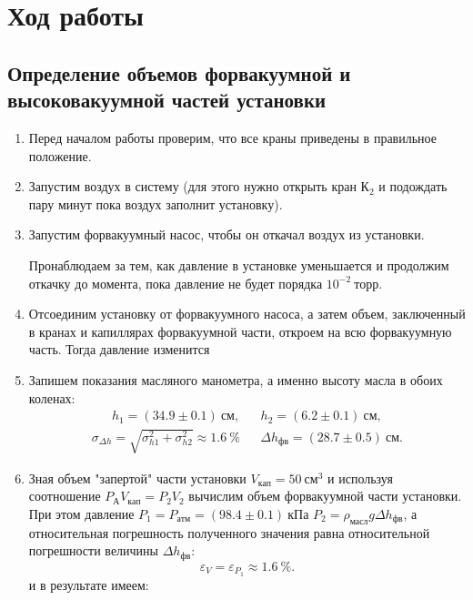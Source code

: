 \documentclass[a4paper,12pt]{article}
\begin{document}
\section{Ход работы}

\subsection{Определение объемов форвакуумной и высоковакуумной частей установки}

\begin{enumerate}

  \item Перед началом работы проверим, что все краны приведены в правильное положение.

  \item Запустим воздух в систему (для этого нужно открыть кран $К_2$  и подождать пару минут пока воздух заполнит установку).

  \item Запустим форвакуумный насос, чтобы он откачал воздух из установки.

        Пронаблюдаем за тем, как давление в установке уменьшается и продолжим откачку до момента, пока давление не будет порядка $ 10^{-2}~торр$.

  \item Отсоединим установку от форвакуумного насоса, а затем объем, заключенный в кранах и капиллярах форвакуумной части, откроем на всю форвакуумную часть. Тогда давление изменится

  \item Запишем показания масляного манометра, а именно высоту масла в обоих коленах:
        \begin{align}
          h_1 = (34.9 \pm 0.1) ~см, &  & h_2 = (6.2 \pm 0.1) ~см,
        \end{align}
        \begin{align}
          \sigma_{\Delta h} = \sqrt{\sigma_{h1}^2 + \sigma_{h2}^2}\approx 1.6~\% &  &
          \Delta h_{фв} = (28.7 \pm 0.5) ~см.
        \end{align}

  \item Зная объем "запертой"  части установки $V_{кап} = 50 ~см^3$ и используя соотношение $P_\text{А} V_{кап}=P_2 V_2$ вычислим объем форвакуумной части установки. При этом давление $P_1 = P_{атм} = (98.4 \pm 0.1) ~кПа$ $P_2 =   \rho_{масл} g \Delta h_{фв}$, а относительная погрешность полученного значения равна относительной погрешности величины $\Delta h_{фв} $:
        $$\varepsilon_V = \varepsilon_{P_1} \approx 1.6 ~\%.$$ и в результате имеем:


\end{enumerate}
\end{document}
